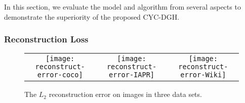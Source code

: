 \documentclass[10pt,journal,twocolumn]{IEEEtran}
\begin{document}
In this section, we evaluate the model and algorithm from several aspects to demonstrate the superiority of the proposed CYC-DGH.

\subsubsection{Reconstruction Loss}

\begin{figure*}[t]
\centering
\begin{tabular}{ccc}
\texttt{[image: reconstruct-error-coco]}&
\texttt{[image: reconstruct-error-IAPR]}&
\texttt{[image: reconstruct-error-Wiki]}\\
\end{tabular}
\caption{The $L_2$ reconstruction error on images in three data sets.}
\label{fig:reconstruction-error}
\end{figure*}
\end{document}
